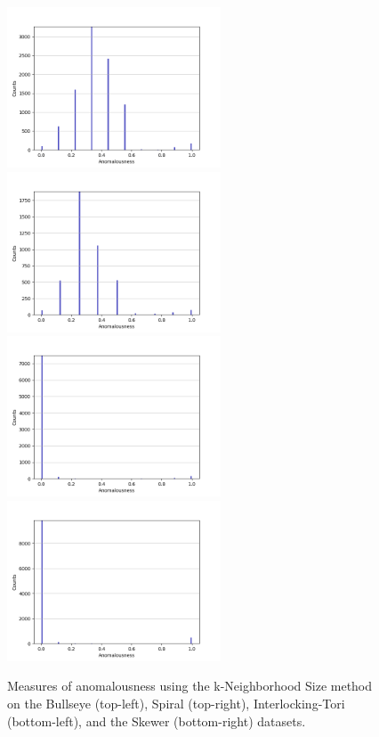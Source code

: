 \begin{figure}[!h]
\centering
\includegraphics[width=2.5in]{static/bullseye_k_neighborhood.png}
\includegraphics[width=2.5in]{static/spiral_k_neighborhood.png}
\includegraphics[width=2.5in]{static/interlocking_tori_k_neighborhood.png}
\includegraphics[width=2.5in]{static/skewer_k_neighborhood.png}

\caption{
Measures of anomalousness using the k-Neighborhood Size method on the Bullseye (top-left), Spiral (top-right), Interlocking-Tori (bottom-left), and the Skewer (bottom-right) datasets.
}

\label{results:histograms:k_neighborhood}
\end{figure}
